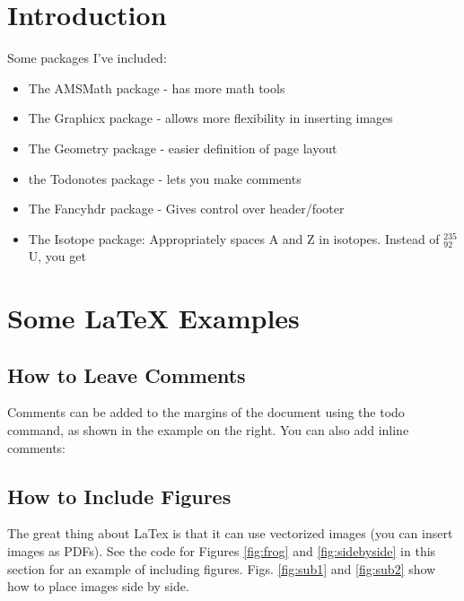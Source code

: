 \begin{abstract}
\blindtext
\end{abstract}



\section{Introduction}



Some packages I've included: 
\begin{itemize}
	\item The AMSMath package - has more math tools
	\item The Graphicx package - allows more flexibility in inserting images
	\item The Geometry package - easier definition of page layout
	\item the Todonotes package - lets you make comments
	\item The Fancyhdr package - Gives control over header/footer
	\item The Isotope package: Appropriately spaces A and Z in isotopes. Instead of $^{235}_{92}$U, you get 
\end{itemize}



\section{Some \LaTeX{} Examples}
\label{sec:examples}

\subsection{How to Leave Comments}

Comments can be added to the margins of the document using the  todo command, as shown in the example on the right. You can also add inline comments:


\subsection{How to Include Figures}

The great thing about LaTex is that it can use vectorized images (you can insert images as PDFs). See the code for Figures \ref{fig:frog} and \ref{fig:sidebyside} in this section for an example of including figures. Figs. \ref{fig:sub1} and \ref{fig:sub2} show how to place images side by side.

